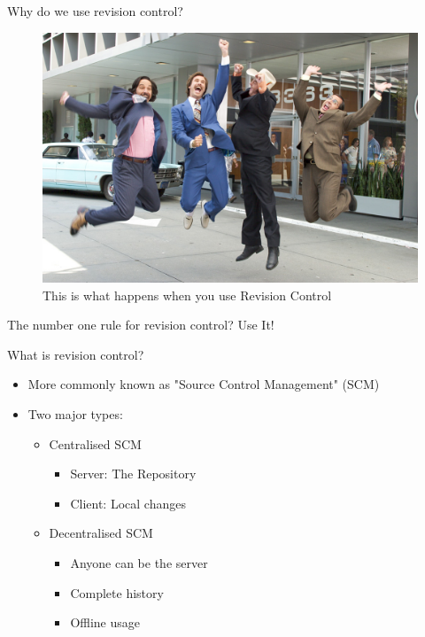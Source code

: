 \documentclass{beamer}
\begin{document}
\begin{frame}{Why do we use revision control?}
    \begin{figure}[ht]
        \centering
        \includegraphics[width=0.8\linewidth]{img/winning.jpg}
        \caption{This is what happens when you use Revision Control}
        \label{fig:figure1}
    \end{figure}
\end{frame}

\begin{frame}{The number one rule for revision control?}
Use It! 
\end{frame}

\begin{frame}{What is revision control?}
    \begin{itemize}
        \item More commonly known as "Source Control Management" (SCM)
        \pause
        \item Two major types:
        \begin{itemize}
            \item Centralised SCM
            \begin{itemize}
                \item Server: The Repository
                \item Client: Local changes
            \end{itemize}
            \pause
            \item Decentralised SCM
            \begin{itemize}
                \item Anyone can be the server %
                \item Complete history
                \item Offline usage
            \end{itemize}
        \end{itemize}  
    \end{itemize}  
\end{frame}
\end{document}
